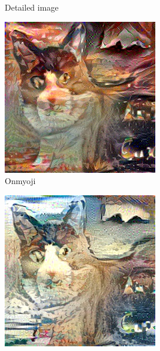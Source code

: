 \documentclass[10pt,twocolumn,letterpaper]{article}
\begin{document}
\begin{figure}[!h]
\begin{subfigure}[b]{0.16\textwidth}
  \caption{Detailed image}
  \label{fig::realdetailed}
\end{subfigure}
%
\begin{subfigure}[b]{0.16\textwidth}
  \includegraphics[width=\textwidth]{figure/realdraw/yys.jpg}
  \caption{Onmyoji}
  \label{fig::realyys}
\end{subfigure}
%
\begin{subfigure}[b]{0.16\textwidth}
  \includegraphics[width=\textwidth]{figure/realdraw/fsh.jpg}

\end{subfigure}
\end{figure}
\end{document}
